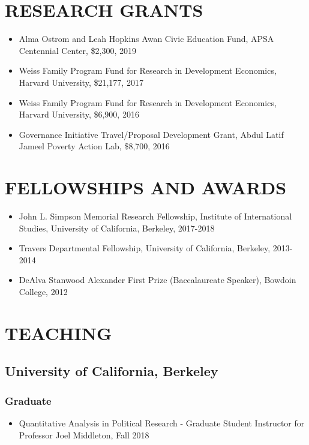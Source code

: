 \documentclass[12pt]{article}
\begin{document}
\section*{RESEARCH GRANTS}
\begin{itemize}
\item[]Alma Ostrom and Leah Hopkins Awan Civic Education Fund, APSA Centennial Center, \$2,300, 2019
\item[] Weiss Family Program Fund for Research in Development Economics, Harvard University, \$21,177, 2017
\item[] Weiss Family Program Fund for Research in Development Economics, Harvard University, \$6,900, 2016
\item[] Governance Initiative Travel/Proposal Development Grant, Abdul Latif Jameel Poverty Action Lab, \$8,700, 2016	
	 
	
\end{itemize}

\vspace{5mm}
\section*{FELLOWSHIPS AND AWARDS} 
\begin{itemize}
	\item[]John L. Simpson Memorial Research Fellowship, Institute of International Studies, University of California, Berkeley, 2017-2018
	\item[]Travers Departmental Fellowship, University of California, Berkeley, 2013-2014
	\item[]DeAlva Stanwood Alexander First Prize (Baccalaureate Speaker), Bowdoin College, 2012
\end{itemize}
\vspace{5mm}
\section*{TEACHING}


\subsection*{University of California, Berkeley}
\subsubsection*{Graduate}
\begin{itemize}
	\item[]Quantitative Analysis in Political Research - Graduate Student Instructor for Professor Joel Middleton, Fall 2018 
\end{itemize}
\end{document}
